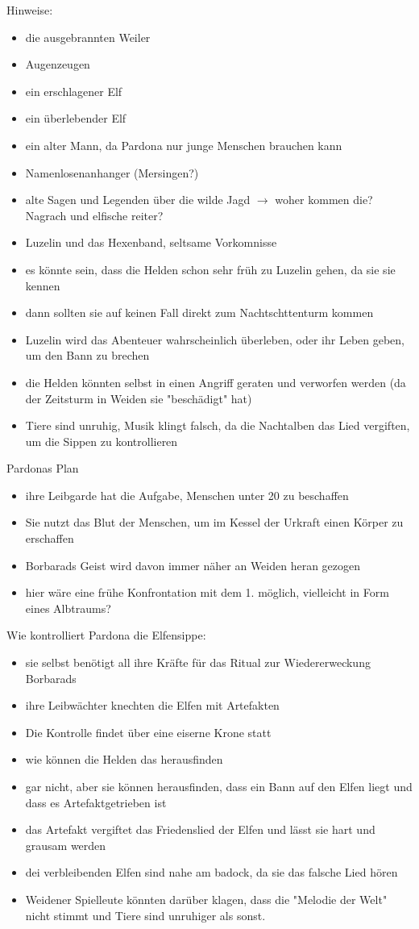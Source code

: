 Hinweise:
\begin{itemize}
	\item  die ausgebrannten Weiler
	\item  Augenzeugen
	\item  ein erschlagener Elf
	\item  ein überlebender Elf
	\item  ein alter Mann, da Pardona nur junge Menschen brauchen kann
	\item  Namenlosenanhanger (Mersingen?)
	\item  alte Sagen und Legenden über die wilde Jagd $\to$ woher kommen die? Nagrach und elfische reiter?
	\item  Luzelin und das Hexenband, seltsame Vorkomnisse
	\item  es könnte sein, dass die Helden schon sehr früh zu Luzelin gehen, da sie sie kennen
	\item  dann sollten sie auf keinen Fall direkt zum Nachtschttenturm kommen
	\item  Luzelin wird das Abenteuer wahrscheinlich überleben, oder ihr Leben geben, um den Bann zu brechen
	\item  die Helden könnten selbst in einen Angriff geraten und verworfen werden (da der Zeitsturm in Weiden sie "beschädigt" hat)
	\item  Tiere sind unruhig, Musik klingt falsch, da die Nachtalben das Lied vergiften, um die Sippen zu kontrollieren
\end{itemize}

Pardonas Plan
\begin{itemize}
	\item  ihre Leibgarde hat die Aufgabe, Menschen unter 20 zu beschaffen
	\item  Sie nutzt das Blut der Menschen, um im Kessel der Urkraft einen Körper zu erschaffen
	\item  Borbarads Geist wird davon immer näher an Weiden heran gezogen
	\item  hier wäre eine frühe Konfrontation mit dem 1. möglich, vielleicht in Form eines Albtraums?
\end{itemize}

Wie kontrolliert Pardona die Elfensippe:
\begin{itemize}
	\item  sie selbst benötigt all ihre Kräfte für das Ritual zur Wiedererweckung Borbarads
	\item  ihre Leibwächter knechten die Elfen mit Artefakten
	\item  Die Kontrolle findet über eine eiserne Krone statt
	\item  wie können die Helden das herausfinden
	\item  gar nicht, aber sie können herausfinden, dass ein Bann auf den Elfen liegt und dass es Artefaktgetrieben ist
	\item  das Artefakt vergiftet das Friedenslied der Elfen und lässt sie hart und grausam werden
	\item  dei verbleibenden Elfen sind nahe am badock, da sie das falsche Lied hören
	\item  Weidener Spielleute könnten darüber klagen, dass die "Melodie der Welt" nicht stimmt und Tiere sind unruhiger als sonst.
\end{itemize}